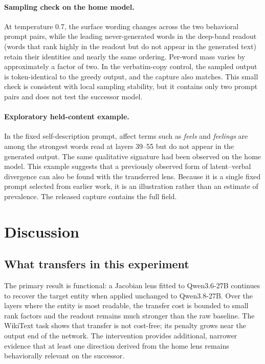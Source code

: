 \documentclass[10pt,a4paper,twocolumn]{article}
\begin{document}
\paragraph{Sampling check on the home model.}
At temperature 0.7, the surface wording changes across the two behavioral
prompt pairs, while the leading never-generated words in the deep-band
readout (words that rank highly in the readout but do not appear in the
generated text) retain their identities and nearly the same ordering. Per-word mass
varies by approximately a factor of two. In the verbatim-copy control, the
sampled output is token-identical to the greedy output, and the capture also
matches. This small check is consistent with local sampling stability, but it
contains only two prompt pairs and does not test the successor model.

\paragraph{Exploratory held-content example.}
In the fixed self-description prompt, affect terms such as \emph{feels} and
\emph{feelings} are among the strongest words read at layers 39--55 but do not
appear in the generated output. The same qualitative signature had been
observed on the home model. This example suggests that a previously observed
form of latent--verbal divergence can also be found with the transferred lens.
Because it is a single fixed prompt selected from earlier work, it is an
illustration rather than an estimate of prevalence. The released capture
contains the full field.

\section{Discussion}

\subsection{What transfers in this experiment}

The primary result is functional: a Jacobian lens fitted to Qwen3.6-27B
continues to recover the target entity when applied unchanged to Qwen3.8-27B.
Over the layers where the entity is most readable, the transfer cost is
bounded to small rank factors and the readout remains much stronger than the
raw baseline. The WikiText task shows that transfer is not cost-free; its
penalty grows near the output end of the network. The intervention provides
additional, narrower evidence that at least one direction derived from the
home lens remains behaviorally relevant on the successor.
\end{document}
